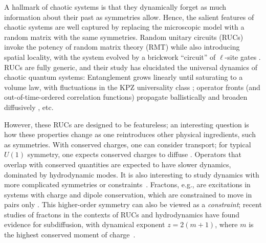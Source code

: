 \documentclass[prl,aps,amsfonts,twocolumn,superscriptaddress,notitlepage,floatfix]{revtex4-1}
\begin{document}
A hallmark of chaotic systems is that they dynamically forget as much information about their past as symmetries allow. Hence, the salient features of chaotic systems are well captured by replacing the microscopic model with a random matrix with the same symmetries. Random unitary circuits (RUCs) invoke the potency of random matrix theory (RMT) while also introducing spatial locality, with the system evolved by a brickwork ``circuit'' of $\ell$-site gates \cite{YoshidaCBD,ProsenRMTChaosPRX,NahumRUC1,NahumOperator,RUCNCTibor,CiracRUFC,CDLC1,Kos_2021,U1FRUC}. RUCs are fully generic, and their study has elucidated the universal dynamics of chaotic quantum systems: Entanglement grows linearly until saturating to a volume law, with fluctuations in the KPZ universality class \cite{NahumRUC1}; operator fronts (and out-of-time-ordered correlation functions) propagate ballistically and broaden diffusively \cite{NahumOperator,RUCNCTibor,CDLC1}, etc. 

However, these RUCs are designed to be featureless; an interesting question is how these properties change as one reintroduces other physical ingredients, such as symmetries. With conserved charges, one can consider transport; for typical $U(1)$ symmetry, one expects conserved charges to diffuse \cite{RUCconTibor,RUCconVedika,ShenkerRMT,U1FRUC}. Operators that overlap with conserved quantities are expected to have slower dynamics, dominated by hydrodynamic modes. It is also interesting to study dynamics %
with more complicated symmetries or constraints~\cite{Valado_2016,PhysRevB.94.235122, PhysRevLett.121.085701, GopalakrishnanAutomata_2018, Lan_2018,Everest_2016,QuantumEast2020,Scherg_2021,PhysRevLett.122.250602,PhysRevResearch.2.033020,Huang_2020}. Fractons, e.g., are excitations in systems with charge and dipole conservation, which are constrained to move in pairs only \cite{SagarFracton1,SagarFracton2}. This higher-order symmetry can also be viewed as a \emph{constraint}; recent studies of fractons in the contexts of RUCs and hydrodynamics have found evidence for subdiffusion, with dynamical exponent $z=2(m+1)$, where $m$ is the highest conserved moment of charge~\cite{FractonSubdiffusionDim,FractonHydro,PhysRevLett.125.245303,morningstarKineticallyConstrainedFreezing2020,FractonSubdiffusion,glorioso2021breakdown,SanjayAmosFracton}.
\end{document}
